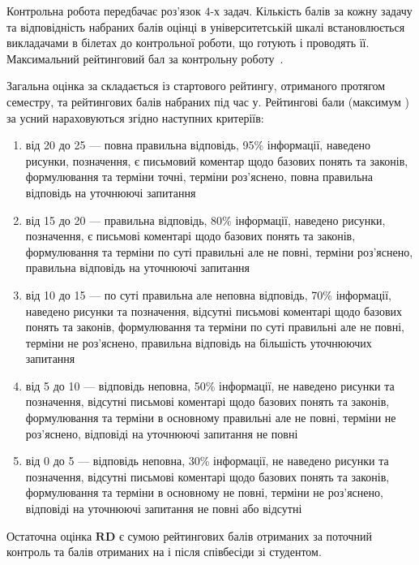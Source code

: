 \documentclass{Syllabus}
\begin{document}
Контрольна робота передбачає роз'язок $4$-х задач. Кількість балів за кожну задачу та відповідність набраних балів оцінці в університетській шкалі встановлюється викладачами в білетах до контрольної роботи, що готують і проводять її. Максимальний рейтинговий бал за контрольну роботу~\controlBalp.

Загальна оцінка за \control{} складається із стартового рейтингу, отриманого протягом семестру, та рейтингових балів набраних під час \control у. Рейтингові бали (максимум \controlBalu) за усний \control{} нараховуються згідно наступних критеріїв:
\begin{enumerate}[label=$\bullet$]
\item від 20 до 25 --- повна правильна відповідь, 95\% інформації, наведено рисунки, позначення, є письмовий коментар щодо базових понять та законів, формулювання та терміни точні, терміни роз’яснено, повна правильна відповідь на уточнюючі запитання
\item від 15 до 20 --- правильна відповідь, 80\% інформації, наведено рисунки, позначення, є письмові коментарі щодо базових понять та законів, формулювання та терміни по суті правильні але не повні, терміни роз’яснено, правильна відповідь на уточнюючі запитання
\item від 10 до 15 --- по суті правильна але неповна відповідь, 70\% інформації, наведено рисунки та позначення, відсутні письмові коментарі щодо базових понять та законів, формулювання та терміни по суті правильні але не повні, терміни не роз’яснено, правильна відповідь на більшість уточнюючих запитання
\item від 5 до 10 --- відповідь неповна, 50\% інформації, не наведено рисунки та позначення, відсутні письмові коментарі щодо базових понять та законів, формулювання та терміни в основному правильні але не повні, терміни не роз’яснено, відповіді на уточнюючі запитання не повні
\item від 0 до 5 --- відповідь неповна, 30\% інформації, не наведено рисунки та позначення, відсутні письмові коментарі щодо базових понять та законів, формулювання та терміни в основному не повні, терміни не роз’яснено, відповіді на уточнюючі запитання не повні або відсутні
\end{enumerate}


Остаточна оцінка $\mathbf{RD}$ є сумою рейтингових балів отриманих за поточний контроль та балів отриманих на \control і після співбесіди зі студентом.
\end{document}
